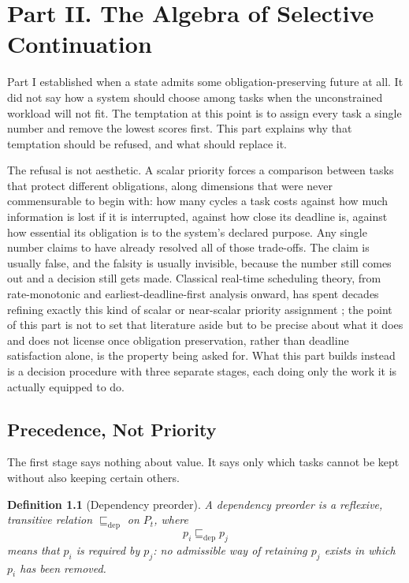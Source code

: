 \documentclass[11pt]{report}
\newtheorem{definition}{Definition}[chapter]
\begin{document}
\part*{Part II. The Algebra of Selective Continuation}

Part I established when a state admits some obligation-preserving future at all. It did not say how a system should choose among tasks when the unconstrained workload will not fit. The temptation at this point is to assign every task a single number and remove the lowest scores first. This part explains why that temptation should be refused, and what should replace it.

The refusal is not aesthetic. A scalar priority forces a comparison between tasks that protect different obligations, along dimensions that were never commensurable to begin with: how many cycles a task costs against how much information is lost if it is interrupted, against how close its deadline is, against how essential its obligation is to the system's declared purpose. Any single number claims to have already resolved all of those trade-offs. The claim is usually false, and the falsity is usually invisible, because the number still comes out and a decision still gets made. Classical real-time scheduling theory, from rate-monotonic and earliest-deadline-first analysis onward, has spent decades refining exactly this kind of scalar or near-scalar priority assignment \cite{liu1973,lehoczky1989,buttazzo2011}; the point of this part is not to set that literature aside but to be precise about what it does and does not license once obligation preservation, rather than deadline satisfaction alone, is the property being asked for. What this part builds instead is a decision procedure with three separate stages, each doing only the work it is actually equipped to do.

\chapter{Precedence, Not Priority}

The first stage says nothing about value. It says only which tasks cannot be kept without also keeping certain others.

\begin{definition}[Dependency preorder]
A dependency preorder is a reflexive, transitive relation $\sqsubseteq_{\mathrm{dep}}$ on $P_t$, where
\[
p_i \sqsubseteq_{\mathrm{dep}} p_j
\]
means that $p_i$ is required by $p_j$: no admissible way of retaining $p_j$ exists in which $p_i$ has been removed.
\end{definition}
\end{document}

